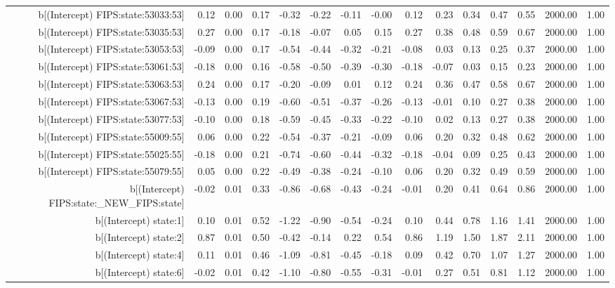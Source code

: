 \begin{table}[ht]
\begin{tabular}{rrrrrrrrrrrrrrr}
  b[(Intercept) FIPS:state:53033:53] & 0.12 & 0.00 & 0.17 & -0.32 & -0.22 & -0.11 & -0.00 & 0.12 & 0.23 & 0.34 & 0.47 & 0.55 & 2000.00 & 1.00 \\ 
  b[(Intercept) FIPS:state:53035:53] & 0.27 & 0.00 & 0.17 & -0.18 & -0.07 & 0.05 & 0.15 & 0.27 & 0.38 & 0.48 & 0.59 & 0.67 & 2000.00 & 1.00 \\ 
  b[(Intercept) FIPS:state:53053:53] & -0.09 & 0.00 & 0.17 & -0.54 & -0.44 & -0.32 & -0.21 & -0.08 & 0.03 & 0.13 & 0.25 & 0.37 & 2000.00 & 1.00 \\ 
  b[(Intercept) FIPS:state:53061:53] & -0.18 & 0.00 & 0.16 & -0.58 & -0.50 & -0.39 & -0.30 & -0.18 & -0.07 & 0.03 & 0.15 & 0.23 & 2000.00 & 1.00 \\ 
  b[(Intercept) FIPS:state:53063:53] & 0.24 & 0.00 & 0.17 & -0.20 & -0.09 & 0.01 & 0.12 & 0.24 & 0.36 & 0.47 & 0.58 & 0.67 & 2000.00 & 1.00 \\ 
  b[(Intercept) FIPS:state:53067:53] & -0.13 & 0.00 & 0.19 & -0.60 & -0.51 & -0.37 & -0.26 & -0.13 & -0.01 & 0.10 & 0.27 & 0.38 & 2000.00 & 1.00 \\ 
  b[(Intercept) FIPS:state:53077:53] & -0.10 & 0.00 & 0.18 & -0.59 & -0.45 & -0.33 & -0.22 & -0.10 & 0.02 & 0.13 & 0.27 & 0.38 & 2000.00 & 1.00 \\ 
  b[(Intercept) FIPS:state:55009:55] & 0.06 & 0.00 & 0.22 & -0.54 & -0.37 & -0.21 & -0.09 & 0.06 & 0.20 & 0.32 & 0.48 & 0.62 & 2000.00 & 1.00 \\ 
  b[(Intercept) FIPS:state:55025:55] & -0.18 & 0.00 & 0.21 & -0.74 & -0.60 & -0.44 & -0.32 & -0.18 & -0.04 & 0.09 & 0.25 & 0.43 & 2000.00 & 1.00 \\ 
  b[(Intercept) FIPS:state:55079:55] & 0.05 & 0.00 & 0.22 & -0.49 & -0.38 & -0.24 & -0.10 & 0.06 & 0.20 & 0.32 & 0.49 & 0.59 & 2000.00 & 1.00 \\ 
  b[(Intercept) FIPS:state:\_NEW\_FIPS:state] & -0.02 & 0.01 & 0.33 & -0.86 & -0.68 & -0.43 & -0.24 & -0.01 & 0.20 & 0.41 & 0.64 & 0.86 & 2000.00 & 1.00 \\ 
  b[(Intercept) state:1] & 0.10 & 0.01 & 0.52 & -1.22 & -0.90 & -0.54 & -0.24 & 0.10 & 0.44 & 0.78 & 1.16 & 1.41 & 2000.00 & 1.00 \\ 
  b[(Intercept) state:2] & 0.87 & 0.01 & 0.50 & -0.42 & -0.14 & 0.22 & 0.54 & 0.86 & 1.19 & 1.50 & 1.87 & 2.11 & 2000.00 & 1.00 \\ 
  b[(Intercept) state:4] & 0.11 & 0.01 & 0.46 & -1.09 & -0.81 & -0.45 & -0.18 & 0.09 & 0.42 & 0.70 & 1.07 & 1.27 & 2000.00 & 1.00 \\ 
  b[(Intercept) state:6] & -0.02 & 0.01 & 0.42 & -1.10 & -0.80 & -0.55 & -0.31 & -0.01 & 0.27 & 0.51 & 0.81 & 1.12 & 2000.00 & 1.00 \\ 

\end{tabular}
\end{table}
